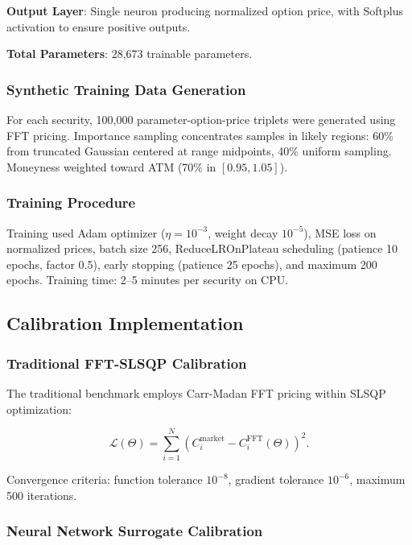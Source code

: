 \documentclass[12pt,a4paper]{article}
\begin{document}
\textbf{Output Layer}: Single neuron producing normalized option price, with Softplus activation to ensure positive outputs.

\textbf{Total Parameters}: 28,673 trainable parameters.

\subsubsection{Synthetic Training Data Generation}

For each security, 100,000 parameter-option-price triplets were generated using FFT pricing. Importance sampling concentrates samples in likely regions: 60\% from truncated Gaussian centered at range midpoints, 40\% uniform sampling. Moneyness weighted toward ATM (70\% in $[0.95, 1.05]$).

\subsubsection{Training Procedure}

Training used Adam optimizer ($\eta = 10^{-3}$, weight decay $10^{-5}$), MSE loss on normalized prices, batch size 256, ReduceLROnPlateau scheduling (patience 10 epochs, factor 0.5), early stopping (patience 25 epochs), and maximum 200 epochs. Training time: 2--5 minutes per security on CPU.

\subsection{Calibration Implementation}

\subsubsection{Traditional FFT-SLSQP Calibration}

The traditional benchmark employs Carr-Madan FFT pricing within SLSQP optimization:

\begin{equation}
\mathcal{L}(\Theta) = \sum_{i=1}^N (C_i^{\text{market}} - C_i^{\text{FFT}}(\Theta))^2.
\end{equation}

Convergence criteria: function tolerance $10^{-8}$, gradient tolerance $10^{-6}$, maximum 500 iterations.

\subsubsection{Neural Network Surrogate Calibration}
\end{document}
